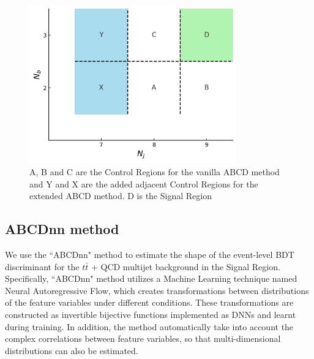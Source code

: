 \documentclass[twoside]{article}
\begin{document}
\begin{figure}[ht]
    \centering
    \includegraphics[width=0.8\textwidth]{plots/extendedabcd/extendedabcd_scheme.png} 
    \caption{A, B and C are the Control Regions for the vanilla ABCD method and Y and X are the added adjacent Control Regions for the extended ABCD method. D is the Signal Region}
    \label{fig:extendedabcd} 
\end{figure}

\subsection{ABCDnn method}
We use the ``ABCDnn" method \cite{abcdnn_original} to estimate the shape of the event-level BDT discriminant for the $t\bar{t}$ + QCD multijet background in the Signal Region. Specifically, ``ABCDnn" method utilizes a Machine Learning technique named Neural Autoregressive Flow, which creates transformations between distributions of the feature variables under different conditions. These transformations are constructed as invertible bijective functions implemented as DNNs and learnt during training. In addition, the method automatically take into account the complex correlations between feature variables, so that multi-dimensional distributions can also be estimated. \\
\end{document}
